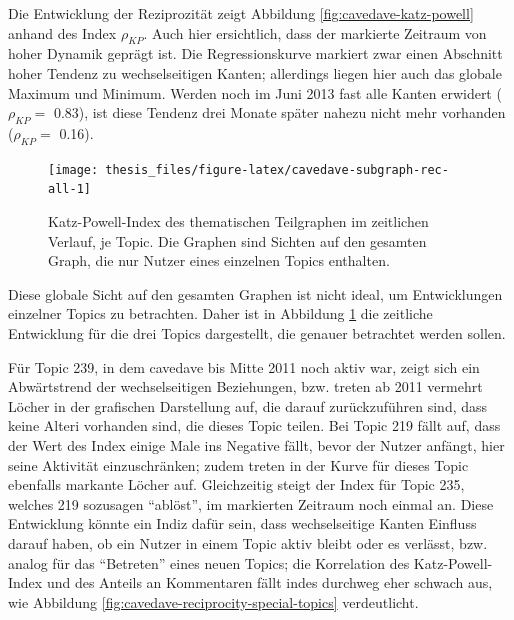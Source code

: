 \documentclass[11pt,a4paper,twoside]{article}
\begin{document}
Die Entwicklung der Reziprozität zeigt Abbildung
\ref{fig:cavedave-katz-powell} anhand des Index \(\rho_{KP}\). Auch hier
ersichtlich, dass der markierte Zeitraum von hoher Dynamik geprägt ist.
Die Regressionskurve markiert zwar einen Abschnitt hoher Tendenz zu
wechselseitigen Kanten; allerdings liegen hier auch das globale Maximum
und Minimum. Werden noch im Juni 2013 fast alle Kanten erwidert
(\(\rho_{KP} =\) 0.83), ist diese Tendenz drei Monate später nahezu
nicht mehr vorhanden (\(\rho_{KP} =\) 0.16).





\begin{figure}

{\centering \texttt{[image: thesis\_files/figure-latex/cavedave-subgraph-rec-all-1]} 

}

\caption{Katz-Powell-Index des thematischen
Teilgraphen im zeitlichen Verlauf, je Topic. Die Graphen sind Sichten
auf den gesamten Graph, die nur Nutzer eines einzelnen Topics enthalten.}\label{fig:cavedave-subgraph-rec-all}
\end{figure}

Diese globale Sicht auf den gesamten Graphen ist nicht ideal, um
Entwicklungen einzelner Topics zu betrachten. Daher ist in Abbildung
\ref{fig:cavedave-subgraph-rec-all} die zeitliche Entwicklung für die
drei Topics dargestellt, die genauer betrachtet werden sollen.

Für Topic 239, in dem cavedave bis Mitte 2011 noch aktiv war, zeigt sich
ein Abwärtstrend der wechselseitigen Beziehungen, bzw. treten ab 2011
vermehrt Löcher in der grafischen Darstellung auf, die darauf
zurückzuführen sind, dass keine Alteri vorhanden sind, die dieses Topic
teilen. Bei Topic 219 fällt auf, dass der Wert des Index einige Male ins
Negative fällt, bevor der Nutzer anfängt, hier seine Aktivität
einzuschränken; zudem treten in der Kurve für dieses Topic ebenfalls
markante Löcher auf. Gleichzeitig steigt der Index für Topic 235,
welches 219 sozusagen \enquote{ablöst}, im markierten Zeitraum noch
einmal an. Diese Entwicklung könnte ein Indiz dafür sein, dass
wechselseitige Kanten Einfluss darauf haben, ob ein Nutzer in einem
Topic aktiv bleibt oder es verlässt, bzw. analog für das
\enquote{Betreten} eines neuen Topics; die Korrelation des
Katz-Powell-Index und des Anteils an Kommentaren fällt indes durchweg
eher schwach aus, wie Abbildung
\ref{fig:cavedave-reciprocity-special-topics} verdeutlicht.
\end{document}
